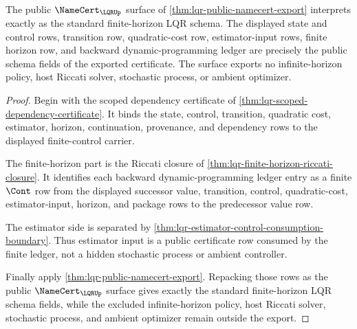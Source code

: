 \begin{theorem}
\label{thm:lqr-public-schema-bridge}
The public $\NameCert_{\LQRUp}$ surface of
\autoref{thm:lqr-public-namecert-export} interprets exactly as the standard
finite-horizon LQR schema. The displayed state and control rows, transition
row, quadratic-cost row, estimator-input rows, finite horizon row, and
backward dynamic-programming ledger are precisely the public schema fields of
the exported certificate. The surface exports no infinite-horizon policy, host
Riccati solver, stochastic process, or ambient optimizer.
\end{theorem}
\begin{proof}
Begin with the scoped dependency certificate of
\autoref{thm:lqr-scoped-dependency-certificate}. It binds the state, control,
transition, quadratic cost, estimator, horizon, continuation, provenance, and
dependency rows to the displayed finite-control carrier.

The finite-horizon part is the Riccati closure of
\autoref{thm:lqr-finite-horizon-riccati-closure}. It identifies each backward
dynamic-programming ledger entry as a finite $\Cont$ row from the displayed
successor value, transition, control, quadratic-cost, estimator-input, horizon,
and package rows to the predecessor value row.

The estimator side is separated by
\autoref{thm:lqr-estimator-control-consumption-boundary}. Thus estimator input
is a public certificate row consumed by the finite ledger, not a hidden
stochastic process or ambient controller.

Finally apply \autoref{thm:lqr-public-namecert-export}. Repacking those rows as
the public $\NameCert_{\LQRUp}$ surface gives exactly the standard
finite-horizon LQR schema fields, while the excluded infinite-horizon policy,
host Riccati solver, stochastic process, and ambient optimizer remain outside
the export.
\end{proof}

